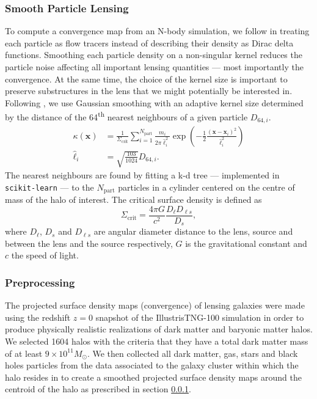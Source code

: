 \subsubsection{Smooth Particle Lensing}\label{sec:SPL}
To compute a convergence map from an N-body simulation, 
we follow \citet{Auger2007} in treating 
each particle as flow tracers instead of describing their density as Dirac delta functions. 
Smoothing each particle density on a non-singular kernel reduces the particle noise affecting all 
important lensing quantities --- most importantly the convergence. At the same time, the choice of the kernel size 
is important to preserve substructures in the 
lens that we might potentially be interested in. Following \citet{Rau2013}, we use Gaussian 
smoothing with an adaptive kernel size determined by the distance of the 64\textsuperscript{th} nearest neighbours of 
a given particle $D_{64,i}$. 
\begin{equation}\label{eq:Ksmooth}
\begin{aligned}
    \kappa(\mathbf{x}) &= \frac{1}{\Sigma_{\mathrm{crit}}} \sum_{i=1}^{N_{\mathrm{part}}}
        \frac{m_i}{2 \pi \hat{\ell}^2_i} 
        \exp \left(-\frac{1}{2} \frac{(\mathbf{x} - \mathbf{x}_i)^2}{\hat{\ell}_i^2}  \right) \\
    \hat{\ell}_i &= \sqrt{\frac{103}{1024}}D_{64,i}.
\end{aligned}
\end{equation}
The nearest neighbours are found by fitting a k-d tree ---  implemented in 
\texttt{scikit-learn} \citep{scikit-learn} --- 
to the $N_{\mathrm{part}}$  particles 
in a cylinder centered on the centre of mass of the halo of interest.
The critical surface density is defined as
\begin{equation}\label{eq:Scrit}
\Sigma_{\mathrm{crit}} = \frac{4 \pi G}{c^ 2} \frac{D_\ell D_{\ell s}}{D_s},
\end{equation}
where $D_\ell$, $D_s$ and $D_{\ell s}$ are angular diameter distance to the lens, source and between the lens and the source respectively, 
$G$ is the gravitational constant and $c$ the speed of light.

\subsubsection{Preprocessing}
The projected surface density maps (convergence) of lensing galaxies 
were made using the redshift $z=0$ snapshot  
of the IllustrisTNG-100 simulation \citep{Nelson2018} 
in order to produce physically realistic realizations of dark matter and baryonic matter halos.
We selected 1604 halos with the criteria that they have a total
dark matter mass of at least $9\times10^{11} M_{\odot}$. We then collected all 
dark matter, gas, stars and black holes particles from the data associated to the galaxy 
cluster within which the halo resides in to create a smoothed projected surface density maps 
around the centroid of the halo as prescribed in section \ref{sec:SPL}.

